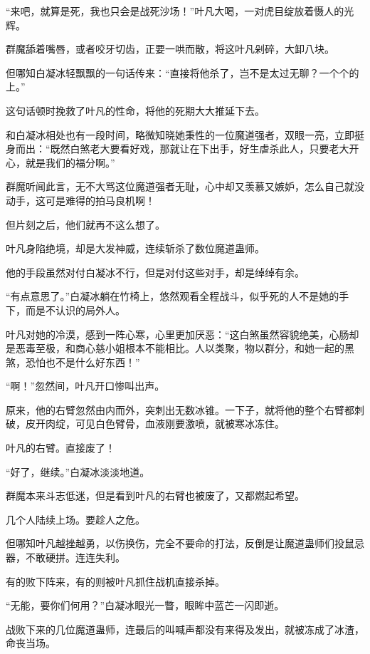 
\begin{this_body}

“来吧，就算是死，我也只会是战死沙场！”叶凡大喝，一对虎目绽放着慑人的光辉。

群魔舔着嘴唇，或者咬牙切齿，正要一哄而散，将这叶凡剁碎，大卸八块。

但哪知白凝冰轻飘飘的一句话传来：“直接将他杀了，岂不是太过无聊？一个个的上。”

这句话顿时挽救了叶凡的性命，将他的死期大大推延下去。

和白凝冰相处也有一段时间，略微知晓她秉性的一位魔道强者，双眼一亮，立即挺身而出：“既然白煞老大要看好戏，那就让在下出手，好生虐杀此人，只要老大开心，就是我们的福分啊。”

群魔听闻此言，无不大骂这位魔道强者无耻，心中却又羡慕又嫉妒，怎么自己就没动手，这可是难得的拍马良机啊！

但片刻之后，他们就再不这么想了。

叶凡身陷绝境，却是大发神威，连续斩杀了数位魔道蛊师。

他的手段虽然对付白凝冰不行，但是对付这些对手，却是绰绰有余。

“有点意思了。”白凝冰躺在竹椅上，悠然观看全程战斗，似乎死的人不是她的手下，而是不认识的局外人。

叶凡对她的冷漠，感到一阵心寒，心里更加厌恶：“这白煞虽然容貌绝美，心肠却是恶毒至极，和商心慈小姐根本不能相比。人以类聚，物以群分，和她一起的黑煞，恐怕也不是什么好东西！”

“啊！”忽然间，叶凡开口惨叫出声。

原来，他的右臂忽然由内而外，突刺出无数冰锥。一下子，就将他的整个右臂都刺破，皮开肉绽，可见白色臂骨，血液刚要激喷，就被寒冰冻住。

叶凡的右臂。直接废了！

“好了，继续。”白凝冰淡淡地道。

群魔本来斗志低迷，但是看到叶凡的右臂也被废了，又都燃起希望。

几个人陆续上场。要趁人之危。

但哪知叶凡越挫越勇，以伤换伤，完全不要命的打法，反倒是让魔道蛊师们投鼠忌器，不敢硬拼。连连失利。

有的败下阵来，有的则被叶凡抓住战机直接杀掉。

“无能，要你们何用？”白凝冰眼光一瞥，眼眸中蓝芒一闪即逝。

战败下来的几位魔道蛊师，连最后的叫喊声都没有来得及发出，就被冻成了冰渣，命丧当场。


\end{this_body}
